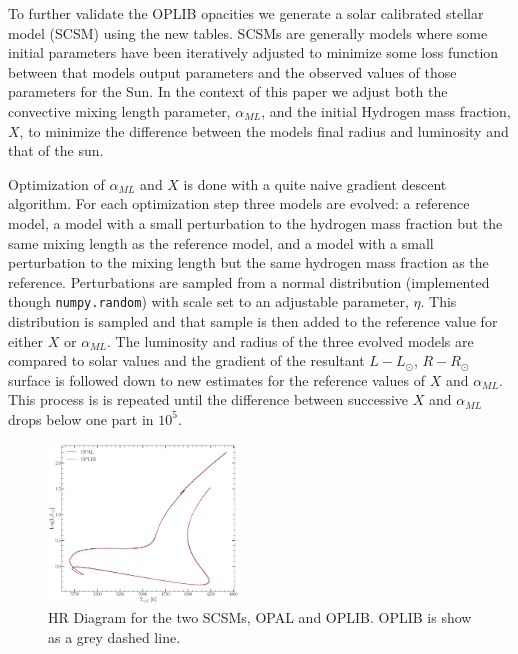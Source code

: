 To further validate the OPLIB opacities we generate a solar calibrated stellar
model (SCSM) using the new tables. SCSMs are generally models where some
initial parameters have been iteratively adjusted to minimize some loss function
between that models output parameters and the observed values of those
parameters for the Sun. In the context of this paper we adjust both the
convective mixing length parameter, $\alpha_{ML}$, and the initial Hydrogen
mass fraction, $X$, to minimize the difference between the models final radius
and luminosity and that of the sun.

Optimization of $\alpha_{ML}$ and $X$ is done with a quite naive gradient
descent algorithm. For each optimization step three models are evolved: a reference
model, a model with a small perturbation to the hydrogen mass fraction but the
same mixing length as the reference model, and a model with a small
perturbation to the mixing length but the same hydrogen mass fraction as the
reference. Perturbations are sampled from a normal distribution (implemented
though \texttt{numpy.random}) with scale set to an adjustable parameter,
$\eta$. This distribution is sampled and that sample is then added to the
reference value for either $X$ or $\alpha_{ML}$. The luminosity and radius of
the three evolved models are compared to solar values and the gradient of the
resultant $L-L_{\odot}$, $R-R_{\odot}$ surface is followed down to new
estimates for the reference values of $X$ and $\alpha_{ML}$. This process is
is repeated until the difference between successive $X$ and $\alpha_{ML}$ drops
below one part in $10^{5}$.

\begin{figure}
	\centering
	\includegraphics[width=0.45\textwidth]{src/figures/HRDiagramOPALvsOPLIB_SCCM.pdf}
	\caption{HR Diagram for the two SCSMs, OPAL and OPLIB. OPLIB is show as a grey
	dashed line.}
	\label{fig:OPLIBOPALHR}
\end{figure}

